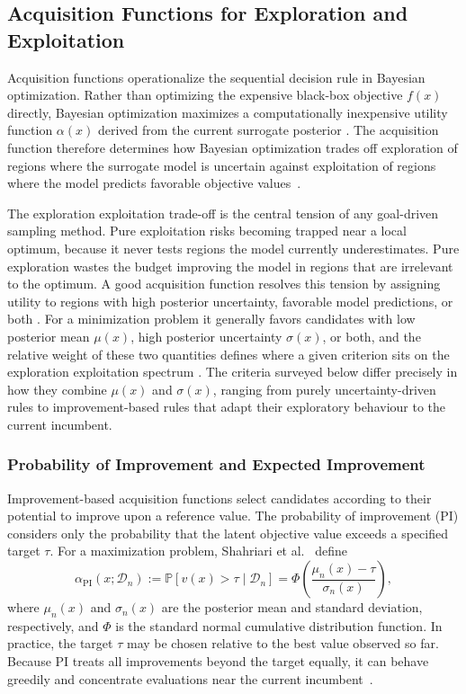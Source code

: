 \subsection{Acquisition Functions for Exploration and Exploitation}
Acquisition functions operationalize the sequential decision rule in Bayesian optimization. Rather than optimizing the expensive black-box objective $f(x)$ directly, Bayesian optimization maximizes a computationally inexpensive utility function $\alpha(x)$ derived from the current surrogate posterior \cite{snoek2012practical,balandat2019botorch}. The acquisition function therefore determines how Bayesian optimization trades off exploration of regions where the surrogate model is uncertain against exploitation of regions where the model predicts favorable objective values~\cite{shahriari2015taking}.

The exploration exploitation trade-off is the central tension of any goal-driven sampling method. Pure exploitation risks becoming trapped near a local optimum, because it never tests regions the model currently underestimates. Pure exploration wastes the budget improving the model in regions that are irrelevant to the optimum. A good acquisition function resolves this tension by assigning utility to regions with high posterior uncertainty, favorable model predictions, or both \cite{shahriari2016taking}. For a minimization problem it generally favors candidates with low posterior mean $\mu(x)$, high posterior uncertainty $\sigma(x)$, or both, and the relative weight of these two quantities defines where a given criterion sits on the exploration exploitation spectrum \cite{di2024active,snoek2012practical}. The criteria surveyed below differ precisely in how they combine $\mu(x)$ and $\sigma(x)$, ranging from purely uncertainty-driven rules to improvement-based rules that adapt their exploratory behaviour to the current incumbent.

\subsubsection{Probability of Improvement and Expected Improvement}
Improvement-based acquisition functions select candidates according to their potential to improve upon a reference value. The probability of improvement (PI) considers only the probability that the latent objective value exceeds a specified target $\tau$. For a maximization problem, Shahriari et al.~\cite{shahriari2015taking} define
\[
\alpha_{\mathrm{PI}}(x;\mathcal{D}_n)
:=
\mathbb{P}\!\left[v(x)>\tau\mid\mathcal{D}_n\right]
=
\Phi\!\left(
\frac{\mu_n(x)-\tau}{\sigma_n(x)}
\right),
\]
where $\mu_n(x)$ and $\sigma_n(x)$ are the posterior mean and standard deviation, respectively, and $\Phi$ is the standard normal cumulative distribution function. In practice, the target $\tau$ may be chosen relative to the best value observed so far. Because PI treats all improvements beyond the target equally, it can behave greedily and concentrate evaluations near the current incumbent~\cite{shahriari2015taking}.

